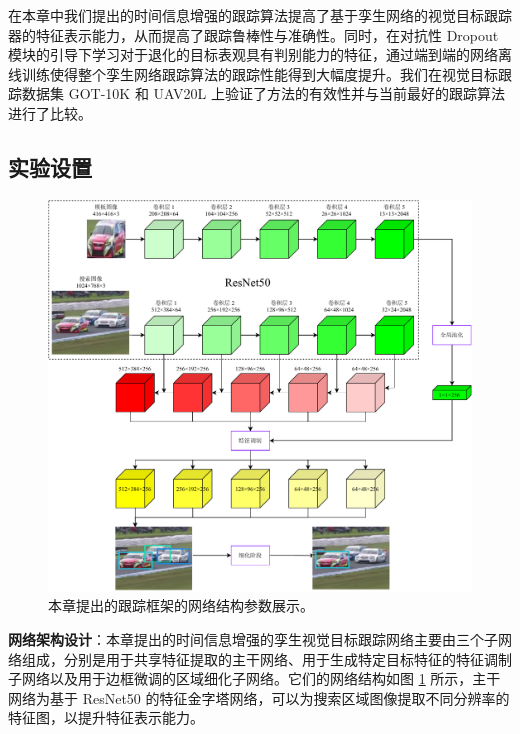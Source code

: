 在本章中我们提出的时间信息增强的跟踪算法提高了基于孪生网络的视觉目标跟踪器的特征表示能力，从而提高了跟踪鲁棒性与准确性。同时，在对抗性 Dropout 模块的引导下学习对于退化的目标表观具有判别能力的特征，通过端到端的网络离线训练使得整个孪生网络跟踪算法的跟踪性能得到大幅度提升。我们在视觉目标跟踪数据集 GOT-10K \cite{GOT-10k} 和 UAV20L \cite{mueller2016benchmark} 上验证了方法的有效性并与当前最好的跟踪算法进行了比较。
\subsection{实验设置}

\begin{figure}[t]
    \centering
    \includegraphics[width=1.0\textwidth]{Img/end/FPN.pdf}
    \caption{本章提出的跟踪框架的网络结构参数展示。}
    \label{fig:end_FPN}
\end{figure}

\textbf{网络架构设计}：本章提出的时间信息增强的孪生视觉目标跟踪网络主要由三个子网络组成，分别是用于共享特征提取的主干网络、用于生成特定目标特征的特征调制子网络以及用于边框微调的区域细化子网络。它们的网络结构如图 \ref{fig:end_FPN} 所示，主干网络为基于 ResNet50 的特征金字塔网络，可以为搜索区域图像提取不同分辨率的特征图，以提升特征表示能力。

